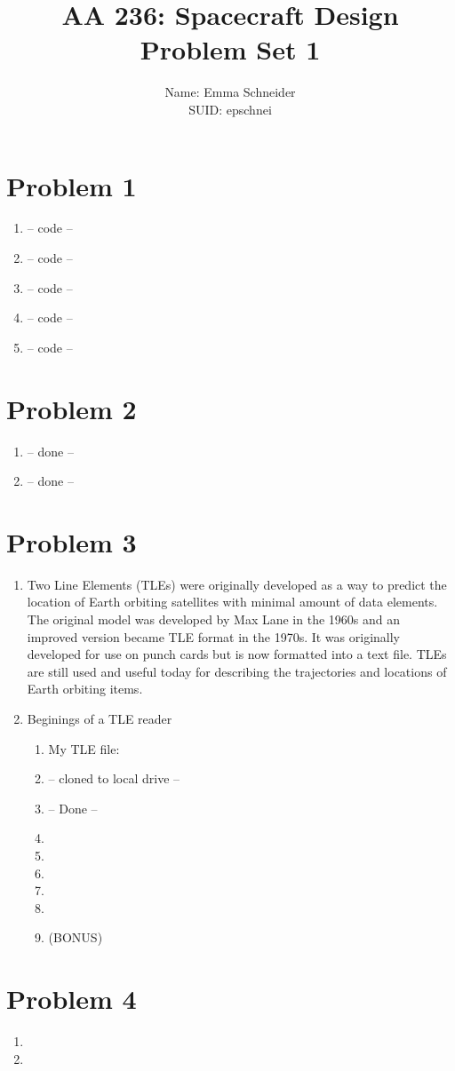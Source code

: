 \documentclass{article}
\title{AA 236: Spacecraft Design \\ Problem Set 1}
\author{Name: Emma Schneider \\ SUID: epschnei}
\date{}
\begin{document}
\maketitle
\pagestyle{fancy} 

\section*{Problem 1}
\begin{enumerate}[label=(\alph*)]
\item -- code --
\item -- code --
\item -- code --
\item -- code --
\item -- code --
\end{enumerate}
\section*{Problem 2}
\begin{enumerate}[label=(\alph*)]
	\item -- done --
	\item -- done --
\end{enumerate}
\section*{Problem 3}
\begin{enumerate}[label=(\alph*)]
	\item Two Line Elements (TLEs) were originally developed as a way to predict the location of Earth orbiting satellites with minimal amount of data elements. The original model was developed by Max Lane in the 1960s and an improved version became TLE format in the 1970s. It was originally developed for use on punch cards but is now formatted into a text file. TLEs are still used and useful today for describing the trajectories and locations of Earth orbiting items. 
	\item Beginings of a TLE reader
	\begin{enumerate}[label=(\roman*)]
		\item My TLE file:
		
		\item -- cloned to local drive --
		\item -- Done --
		
		\item
		\item
		\item
		
		\item
		\item
		\item (BONUS)
	\end{enumerate}
\end{enumerate}
\section*{Problem 4}
\begin{enumerate}[label=(\alph*)]
	\item
	\item
\end{enumerate}
\end{document}
